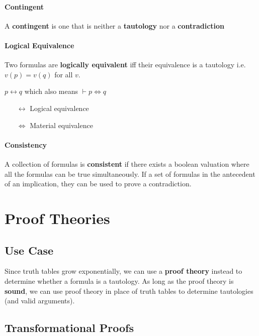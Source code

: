         \paragraph{Contingent} A \textbf{contingent} is one that is neither a
        \textbf{tautology} nor a \textbf{contradiction}

        \paragraph{Logical Equivalence} Two formulas are \textbf{logically
        equivalent} iff their equivalence is a tautology i.e. $v(p) = v(q)$ for
        all $v$.
        \begin{center}
          $p\leftrightarrow q$ which also means $\vdash p \Leftrightarrow q$
        \end{center}
        \begin{itemize}
          \item[$\leftrightarrow$] Logical equivalence
          \item[$\Leftrightarrow$] Material equivalence
        \end{itemize}

        \paragraph{Consistency} A collection of formulas is \textbf{consistent}
        if there exists a boolean valuation where all the formulas can be true
        simultaneously. If a set of formulas in the antecedent of an
        implication, they can be used to prove a contradiction.

  \section{Proof Theories}
    \subsection{Use Case}
      Since truth tables grow exponentially, we can use a \textbf{proof theory}
      instead to determine whether a formula is a tautology. As long as the
      proof theory is \textbf{sound}, we can use proof theory in place of truth
      tables to determine tautologies (and valid arguments).

    \subsection{Transformational Proofs}
